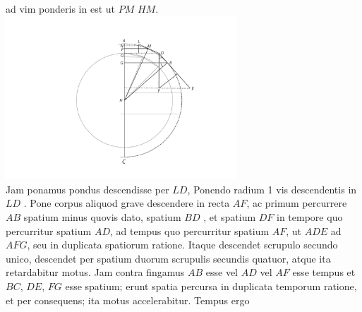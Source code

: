 ad vim ponderis in
 est ut $PM$  $HM$.
\pend 
\pstart
\count{}
\noindent
\centering
\includegraphics[width=0.65\textwidth]{images/lh0351009_004v-d1.pdf}\\
\pend
\pstart \vspace{1em}Jam ponamus pondus descendisse per $LD$,  Ponendo radium 1 vis descendentis in $LD$ . 
\pend 
\pstart Pone corpus aliquod grave descendere in recta $AF$, ac primum percurrere $AB$ spatium minus quovis dato,  spatium $BD$ , et spatium $DF$ in tempore  quo percurritur spatium $AD$, ad tempus quo percurritur spatium $AF$, ut $ADE$ ad $AFG$, seu in duplicata spatiorum ratione.
Itaque  descendet scrupulo secundo unico, descendet per spatium duorum scrupulis secundis quatuor, atque ita retardabitur motus. Jam contra fingamus $AB$ esse vel $AD$ vel $AF$ esse tempus et $BC$, $DE$, $FG$ esse spatium; erunt spatia percursa in duplicata temporum ratione, et per consequens; ita motus accelerabitur. Tempus ergo
